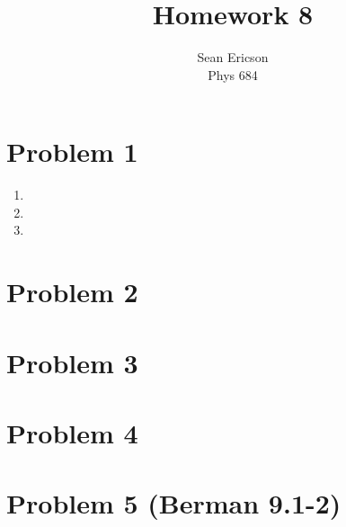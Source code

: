 \documentclass[12pt]{article}
\begin{document}
	
\title{Homework 8}
\author{Sean Ericson \\ Phys 684}
\maketitle

\section*{Problem 1}
\begin{enumerate}[label=(\alph*)]
    \item 
    \item
    \item
\end{enumerate}


\section*{Problem 2}



\section*{Problem 3}



\section*{Problem 4}



\section*{Problem 5 (Berman 9.1-2)}

%
\end{document}
